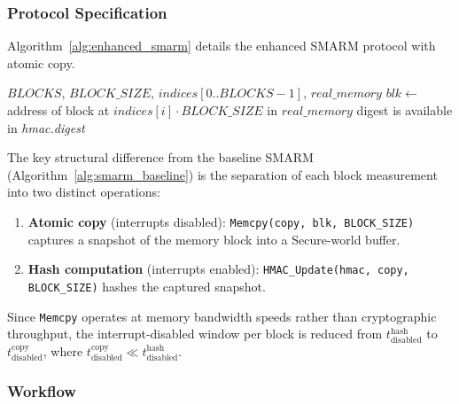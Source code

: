 \documentclass[a4paper,10pt]{article}
\begin{document}
{\subsubsection{Protocol Specification}

Algorithm~\ref{alg:enhanced_smarm} details the enhanced SMARM 
protocol with atomic copy.


\begin{algorithm}
\caption{Enhanced SMARM (atomic copy: interrupts disabled around memcpy only)}
\label{alg:enhanced_smarm}
\begin{algorithmic}[1]
\Require $BLOCKS$, $BLOCK\_SIZE$, $indices[0..BLOCKS-1]$, $real\_memory$
\State {}
  \State $blk \gets$ address of block at $indices[i]\cdot BLOCK\_SIZE$ in $real\_memory$
  \State {}
  \State {}
  \State {}
  \State {}
\EndFor
\State {}
\Ensure digest is available in \textit{hmac.digest}
\end{algorithmic}
\end{algorithm}


The key structural difference from the baseline SMARM 
(Algorithm~\ref{alg:smarm_baseline}) is the separation of each 
block measurement into two distinct operations:

\begin{enumerate}
    \item \textbf{Atomic copy} (interrupts disabled): 
    \texttt{Memcpy(copy, blk, BLOCK\_SIZE)} captures a snapshot 
    of the memory block into a Secure-world buffer.
    \item \textbf{Hash computation} (interrupts enabled): 
    \texttt{HMAC\_Update(hmac, copy, BLOCK\_SIZE)} hashes the 
    captured snapshot.
\end{enumerate}

Since \texttt{Memcpy} operates at memory bandwidth speeds rather 
than cryptographic throughput, the interrupt-disabled window per 
block is reduced from $t_{\mathrm{disabled}}^{\text{hash}}$ to 
$t_{\mathrm{disabled}}^{\text{copy}}$, where 
$t_{\mathrm{disabled}}^{\text{copy}} \ll 
t_{\mathrm{disabled}}^{\text{hash}}$.

\subsubsection{Workflow}
\label{sec:atomic-copy-workflow}


}
\end{document}
